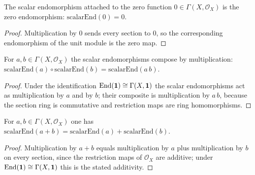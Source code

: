 \begin{lemma}\label{mk-lem:gr_scalarEnd_zero}
  \leanok

  The scalar endomorphism attached to the zero function \(0 \in
  \Gamma(X, \mathcal{O}_X)\) is the zero endomorphism:
  \(\mathrm{scalarEnd}(0) = 0\).
\end{lemma}

\begin{proof}
  Multiplication by \(0\) sends every section to \(0\), so the corresponding
  endomorphism of the unit module is the zero map.
\end{proof}

\begin{lemma}\label{mk-lem:gr_scalarEnd_comp}
  \leanok

  For \(a, b \in \Gamma(X, \mathcal{O}_X)\) the scalar endomorphisms compose by
  multiplication: \(\mathrm{scalarEnd}(a) \circ \mathrm{scalarEnd}(b) =
  \mathrm{scalarEnd}(a\,b)\).
\end{lemma}
\begin{proof}
  Under the identification \(\operatorname{End}(\mathbf{1}) \cong \Gamma(X, \mathbf{1})\) the
  scalar endomorphisms act as multiplication by \(a\) and by \(b\); their composite
  is multiplication by \(a\,b\), because the section ring is commutative and
  restriction maps are ring homomorphisms.
\end{proof}

\begin{lemma}\label{mk-lem:gr_scalarEnd_add}
  \leanok

  For \(a, b \in \Gamma(X, \mathcal{O}_X)\) one has \(\mathrm{scalarEnd}(a + b) =
  \mathrm{scalarEnd}(a) + \mathrm{scalarEnd}(b)\).
\end{lemma}
\begin{proof}
  Multiplication by \(a + b\) equals multiplication by \(a\) plus multiplication by
  \(b\) on every section, since the restriction maps of \(\mathcal{O}_X\) are additive;
  under \(\operatorname{End}(\mathbf{1}) \cong \Gamma(X, \mathbf{1})\) this is the stated additivity.
\end{proof}


